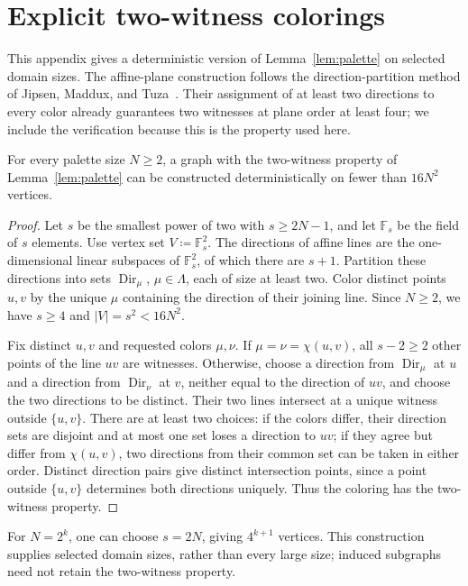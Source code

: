 \section{Explicit two-witness colorings}\label{app:explicit}
This appendix gives a deterministic version of Lemma~\ref{lem:palette} on
selected domain sizes. The affine-plane construction follows the
direction-partition method of Jipsen, Maddux, and
Tuza~\citep{jipsen-maddux-tuza1995}. Their assignment of at least two
directions to every color already guarantees two witnesses at plane
order at least four; we include the verification because this is the
property used here.

\begin{proposition}\label{prop:explicit-graphs}
For every palette size $N\ge2$, a graph with the two-witness property
of Lemma~\ref{lem:palette} can be constructed deterministically on fewer
than $16N^2$ vertices.
\end{proposition}
\begin{proof}
Let $s$ be the smallest power of two with $s\ge2N-1$, and let
$\mathbb F_s$ be the field of $s$ elements. Use vertex set $V\coloneqq\mathbb F_s^2$.
The directions of affine lines are the one-dimensional linear
subspaces of $\mathbb F_s^2$, of which there are $s+1$. Partition these
directions into sets $\operatorname{Dir}_\mu$, $\mu\in\Lambda$, each of
size at least two. Color distinct points $u,v$ by the unique $\mu$ containing the
direction of their joining line. Since $N\ge2$, we have $s\ge4$ and
$|V|=s^2<16N^2$.

Fix distinct $u,v$ and requested colors $\mu,\nu$.
If $\mu=\nu=\chi(u,v)$, all $s-2\ge2$ other points of the line $uv$
are witnesses. Otherwise, choose a direction from
$\operatorname{Dir}_\mu$ at $u$ and a direction from
$\operatorname{Dir}_\nu$ at $v$, neither equal to the direction of $uv$,
and choose the two directions to be distinct. Their two lines intersect
at a unique witness outside $\{u,v\}$. There are at least two choices:
if the colors differ, their direction sets are disjoint and at most one
set loses a direction to $uv$; if they agree but differ from $\chi(u,v)$,
two directions from their common set can be taken in either order.
Distinct direction pairs give distinct intersection points, since a
point outside $\{u,v\}$ determines both directions uniquely. Thus the
coloring has the two-witness property.
\end{proof}
For $N=2^k$, one can choose $s=2N$, giving $4^{k+1}$ vertices.
This construction supplies selected domain sizes, rather than every large
size; induced subgraphs need not retain the two-witness property.
